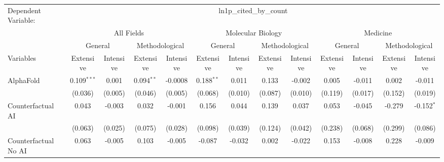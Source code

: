 \begingroup
\centering
\begin{tabular}{lcccccccccccc}
   \tabularnewline \midrule \midrule
   Dependent Variable: & \multicolumn{12}{c}{ln1p\_cited\_by\_count}\\
 & \multicolumn{4}{c}{All Fields} & \multicolumn{4}{c}{Molecular Biology} & \multicolumn{4}{c}{Medicine} \\
\cmidrule(lr){2-5} \cmidrule(lr){6-9} \cmidrule(lr){10-13}
 & \multicolumn{2}{c}{General} & \multicolumn{2}{c}{Methodological} & \multicolumn{2}{c}{General} & \multicolumn{2}{c}{Methodological} & \multicolumn{2}{c}{General} & \multicolumn{2}{c}{Methodological} \\
\cmidrule(lr){2-3} \cmidrule(lr){4-5} \cmidrule(lr){6-7} \cmidrule(lr){8-9} \cmidrule(lr){10-11} \cmidrule(lr){12-13}
Variables & \multicolumn{1}{c}{Extensive} & \multicolumn{1}{c}{Intensive} & \multicolumn{1}{c}{Extensive} & \multicolumn{1}{c}{Intensive} & \multicolumn{1}{c}{Extensive} & \multicolumn{1}{c}{Intensive} & \multicolumn{1}{c}{Extensive} & \multicolumn{1}{c}{Intensive} & \multicolumn{1}{c}{Extensive} & \multicolumn{1}{c}{Intensive} & \multicolumn{1}{c}{Extensive} & \multicolumn{1}{c}{Intensive} \\
\cmidrule(lr){1-1}\cmidrule(lr){2-2} \cmidrule(lr){3-3} \cmidrule(lr){4-4} \cmidrule(lr){5-5} \cmidrule(lr){6-6} \cmidrule(lr){7-7} \cmidrule(lr){8-8} \cmidrule(lr){9-9} \cmidrule(lr){10-10} \cmidrule(lr){11-11} \cmidrule(lr){12-12} \cmidrule(lr){13-13}
   AlphaFold                                & 0.109$^{***}$ & 0.001    & 0.094$^{**}$  & -0.0008  & 0.188$^{**}$ & 0.011        & 0.133   & -0.002   & 0.005   & -0.011   & 0.002        & -0.011\\   
                                            & (0.036)       & (0.005)  & (0.046)       & (0.005)  & (0.068)      & (0.010)      & (0.087) & (0.010)  & (0.119) & (0.017)  & (0.152)      & (0.019)\\   
   Counterfactual AI                        & 0.043         & -0.003   & 0.032         & -0.001   & 0.156        & 0.044        & 0.139   & 0.037    & 0.053   & -0.045   & -0.279       & -0.152$^{*}$\\   
                                            & (0.063)       & (0.025)  & (0.075)       & (0.028)  & (0.098)      & (0.039)      & (0.124) & (0.042)  & (0.238) & (0.068)  & (0.299)      & (0.086)\\   
   Counterfactual No AI                     & 0.063         & -0.005   & 0.103         & -0.005   & -0.087       & -0.032       & 0.002   & -0.022   & 0.153   & -0.008   & 0.228        & -0.009\\   

\end{tabular}
